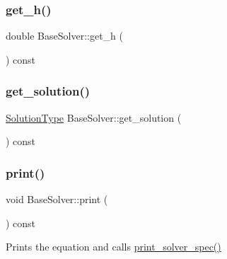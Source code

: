 \mbox{\label{classBaseSolver_a4f4ada66347913e8ac7d6c11d2c87b2c}} 
\subsubsection{\texorpdfstring{get\+\_\+h()}{get\_h()}}
{\footnotesize\ttfamily double Base\+Solver\+::get\+\_\+h (\begin{DoxyParamCaption}{ }\end{DoxyParamCaption}) const\hspace{0.3cm}{\ttfamily [inline]}}

\mbox{\label{classBaseSolver_a6c867079cffc2aaa2af28425b4ea9d40}} 
\subsubsection{\texorpdfstring{get\+\_\+solution()}{get\_solution()}}
{\footnotesize\ttfamily \hyperlink{utils_8hpp_a400268d86a9a9e939d9cce230bafc868}{Solution\+Type} Base\+Solver\+::get\+\_\+solution (\begin{DoxyParamCaption}{ }\end{DoxyParamCaption}) const\hspace{0.3cm}{\ttfamily [inline]}}

\mbox{\label{classBaseSolver_a8dd30ba31c4fe6268f1bc779b3b1c8fa}} 
\subsubsection{\texorpdfstring{print()}{print()}}
{\footnotesize\ttfamily void Base\+Solver\+::print (\begin{DoxyParamCaption}{ }\end{DoxyParamCaption}) const\hspace{0.3cm}{\ttfamily [virtual]}}



Prints the equation and calls \hyperlink{classBaseSolver_a44725e315b208c0ee69ba8fd5d172e09}{print\+\_\+solver\+\_\+spec()} 

